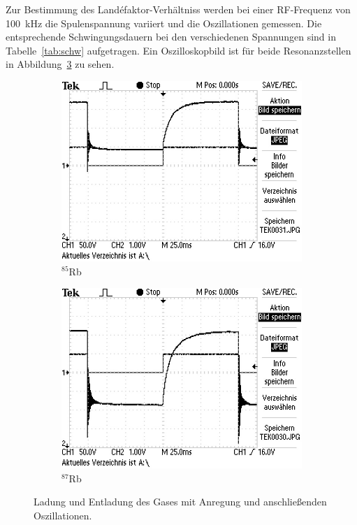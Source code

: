 Zur Bestimmung des Land\'efaktor-Verhältniss werden bei einer RF-Frequenz von
\SI{100}{\kilo\hertz} die Spulenspannung variiert und die Oszillationen gemessen.
Die entsprechende Schwingungsdauern bei den verschiedenen Spannungen sind in
Tabelle~\ref{tab:schw} aufgetragen.
Ein Oszilloskopbild ist für beide Resonanzstellen in
Abbildung~\ref{fig:osz} zu sehen.
\begin{figure}[h]
	\centering
	\begin{subfigure}[c]{0.45\textwidth}
	\begin{center}
	\includegraphics[width=\textwidth]{./picture/Peak_1.JPG}
	\end{center}
	\caption{$^{85}$Rb}%
	\label{fig:}
	\end{subfigure}
	\begin{subfigure}[c]{0.45\textwidth}
	\begin{center}
	\includegraphics[width=\textwidth]{./picture/Peak_2.JPG}
	\end{center}
	\caption{$^{87}$Rb}%
	\label{fig:}
	\end{subfigure}
	\caption{Ladung und Entladung des Gases mit Anregung und anschließenden
  Oszillationen.}%
	\label{fig:osz}
\end{figure}
